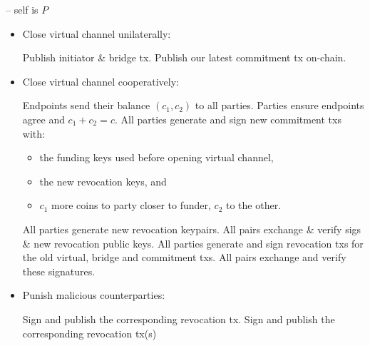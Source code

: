 \begin{center}
\begin{processbox}{\pchan -- self is $P$}
\begin{itemize}
      \item Close virtual channel unilaterally:
      \begin{algorithmic}[0]
        \State Publish initiator \& bridge tx. 
        \State Publish our latest commitment tx on-chain.
      \end{algorithmic}

      \item Close virtual channel cooperatively: 
      \begin{algorithmic}[0]
        \State Endpoints send their balance $(c_1, c_2)$ to all
        parties.
        \State Parties ensure endpoints agree and $c_1 + c_2 = c$.
        \State All parties generate and sign new commitment txs with:
        \begin{itemize}
          \item the funding keys used before opening virtual channel,
          \item the new revocation keys, and
          \item $c_1$ more coins to party closer to funder, $c_2$ to the
          other.
        \end{itemize}
        \State All parties generate new revocation keypairs.
        \State All pairs exchange \& verify sigs \& new revocation public keys.
        \State All parties generate and sign revocation txs for the old virtual,
        bridge and commitment txs.
        \State All pairs exchange and verify these signatures.
      \end{algorithmic}

      \item Punish malicious counterparties: 
      \begin{algorithmic}[0]
          \State Sign and publish the corresponding revocation tx.
        \EndIf
          \State Sign and publish the corresponding revocation tx(s)
        \EndIf
      \end{algorithmic}
    \end{itemize}
  \end{processbox}
  \label{code:pseudocode}
\end{center}
